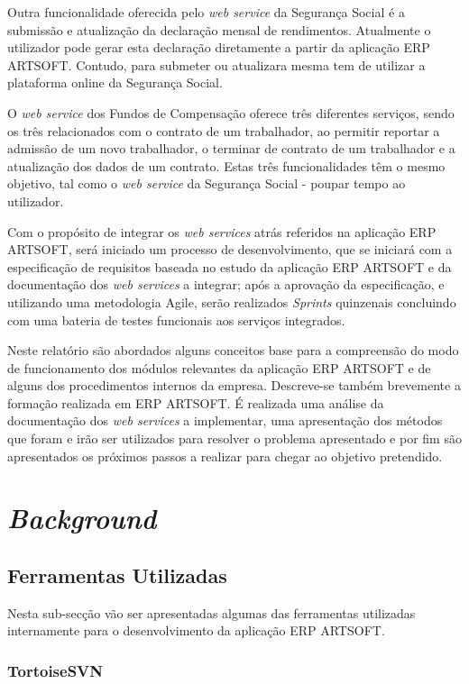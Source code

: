 \documentclass[sigplan]{acmart}
\begin{document}
Outra funcionalidade oferecida pelo \textit{web service} da Segurança Social é a submissão e atualização da declaração mensal de rendimentos. Atualmente o utilizador pode gerar esta declaração diretamente a partir da aplicação ERP ARTSOFT. Contudo, para submeter ou atualizara mesma tem de utilizar a plataforma online da Segurança Social.

O \textit{web service} dos Fundos de Compensação oferece três diferentes serviços, sendo os três relacionados com o contrato de um trabalhador, ao permitir reportar a admissão de um novo trabalhador, o terminar de contrato de um trabalhador e a atualização dos dados de um contrato. Estas três funcionalidades têm o mesmo objetivo, tal como o \textit{web service} da Segurança Social - poupar tempo ao utilizador.

Com o propósito de integrar os \textit{web services} atrás referidos na aplicação ERP ARTSOFT, será iniciado um processo de desenvolvimento, que se iniciará com a especificação de requisitos baseada no estudo da aplicação ERP ARTSOFT e da documentação dos \textit{web services} a integrar; após a aprovação da especificação, e utilizando uma metodologia Agile, serão realizados \textit{Sprints} quinzenais concluindo com uma bateria de testes funcionais aos serviços integrados.

Neste relatório são abordados alguns conceitos base para a compreensão do modo de funcionamento dos módulos relevantes da aplicação ERP ARTSOFT e de alguns dos procedimentos internos da empresa. Descreve-se também brevemente a formação realizada em ERP ARTSOFT. É realizada uma análise da documentação dos \textit{web services} a implementar, uma apresentação dos métodos que foram e irão ser utilizados para resolver o problema apresentado e por fim são apresentados os próximos passos a realizar para chegar ao objetivo pretendido.

\section{\textit{Background}} \label{sec:background}

\subsection{Ferramentas Utilizadas}

Nesta sub-secção vão ser apresentadas algumas das ferramentas utilizadas internamente para o desenvolvimento da aplicação ERP ARTSOFT.

\subsubsection{TortoiseSVN}
\end{document}
